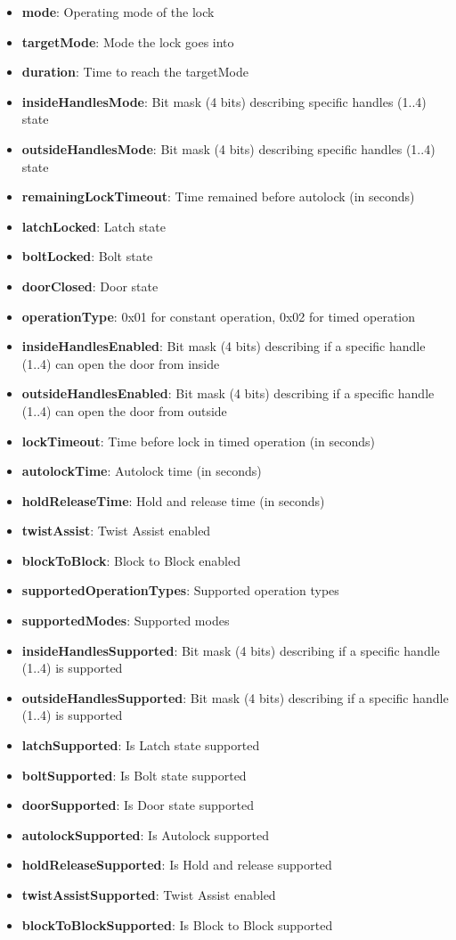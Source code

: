 \begin{itemize}
\item \textbf{mode}: Operating mode of the lock
\item \textbf{targetMode}: Mode the lock goes into
\item \textbf{duration}: Time to reach the targetMode
\item \textbf{insideHandlesMode}: Bit mask (4 bits) describing specific handles (1..4) state
\item \textbf{outsideHandlesMode}: Bit mask (4 bits) describing specific handles (1..4) state
\item \textbf{remainingLockTimeout}: Time remained before autolock (in seconds)
\item \textbf{latchLocked}: Latch state
\item \textbf{boltLocked}: Bolt state
\item \textbf{doorClosed}: Door state
\item \textbf{operationType}: 0x01 for constant operation, 0x02 for timed operation
\item \textbf{insideHandlesEnabled}: Bit mask (4 bits) describing if a specific handle (1..4) can open the door from inside
\item \textbf{outsideHandlesEnabled}: Bit mask (4 bits) describing if a specific handle (1..4) can open the door from outside
\item \textbf{lockTimeout}: Time before lock in timed operation (in seconds)
\item \textbf{autolockTime}: Autolock time (in seconds)
\item \textbf{holdReleaseTime}: Hold and release time (in seconds)
\item \textbf{twistAssist}: Twist Assist enabled
\item \textbf{blockToBlock}: Block to Block enabled
\item \textbf{supportedOperationTypes}: Supported operation types
\item \textbf{supportedModes}: Supported modes
\item \textbf{insideHandlesSupported}: Bit mask (4 bits) describing if a specific handle (1..4) is supported
\item \textbf{outsideHandlesSupported}: Bit mask (4 bits) describing if a specific handle (1..4) is supported
\item \textbf{latchSupported}: Is Latch state supported
\item \textbf{boltSupported}: Is Bolt state supported
\item \textbf{doorSupported}: Is Door state supported
\item \textbf{autolockSupported}: Is Autolock supported
\item \textbf{holdReleaseSupported}: Is Hold and release supported
\item \textbf{twistAssistSupported}: Twist Assist enabled
\item \textbf{blockToBlockSupported}: Is Block to Block supported
\end{itemize}

